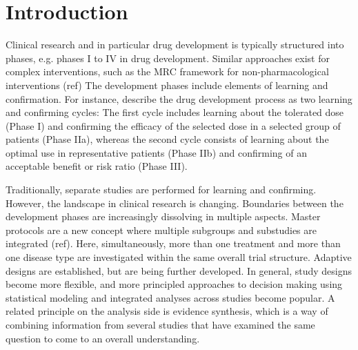 \documentclass[bimj,fleqn]{w-art}
\theoremstyle{plain}
\theoremstyle{definition}
\begin{document}
\maketitle                   %







\section{Introduction}

Clinical research and in particular drug development is typically structured into phases, e.g. phases I to IV in drug development. 
Similar approaches exist for complex interventions, such as the MRC framework for non-pharmacological interventions (ref)%
The development phases include elements of learning and confirmation.
For instance, \citet{sheiner_learning_1997} describe the drug development process as two learning and confirming cycles:
The first cycle includes learning about the tolerated dose (Phase I) and confirming the efficacy of the selected dose in a selected group of patients (Phase IIa), whereas the second cycle consists of learning about the optimal use in representative patients (Phase IIb) and confirming of an acceptable benefit or risk ratio (Phase III).

Traditionally, separate studies are performed for learning and confirming.
However, the landscape in clinical research is changing.
Boundaries between the development phases are increasingly dissolving in multiple aspects.
Master protocols are a new concept where multiple subgroups and substudies are integrated (ref). %
Here, simultaneously, more than one treatment and more than one disease type are investigated within the same overall trial structure.
Adaptive designs are established, but are being further developed.
In general, study designs become more flexible, and more principled approaches to decision making using statistical modeling and integrated analyses across studies become popular. 
A related principle on the analysis side is evidence synthesis, which is a way of combining information from several studies that have examined the same question to come to an overall understanding.
\end{document}
